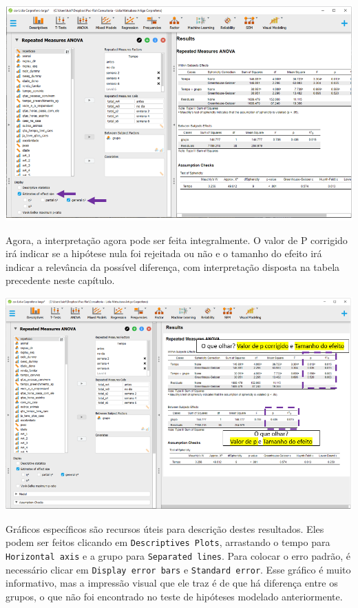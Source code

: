 \documentclass[
]{book}
\begin{document}
\includegraphics{./img/cap_anovarm_tamanho_do_efeito.png}

Agora, a interpretação agora pode ser feita integralmente. O valor de P corrigido irá indicar se a hipótese nula foi rejeitada ou não e o tamanho do efeito irá indicar a relevância da possível diferença, com interpretação disposta na tabela precedente neste capítulo.

\includegraphics{./img/cap_anovarm_interpretacao.png}

Gráficos específicos são recursos úteis para descrição destes resultados. Eles podem ser feitos clicando em \texttt{Descriptives\ Plots}, arrastando o tempo para \texttt{Horizontal\ axis} e a grupo para \texttt{Separated\ lines}. Para colocar o erro padrão, é necessário clicar em \texttt{Display\ error\ bars} e \texttt{Standard\ error}. Esse gráfico é muito informativo, mas a impressão visual que ele traz é de que há diferença entre os grupos, o que não foi encontrado no teste de hipóteses modelado anteriormente.
\end{document}
